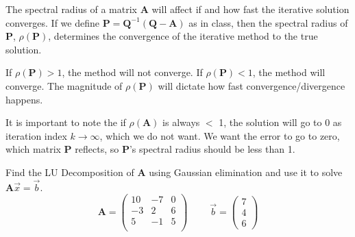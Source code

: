 \documentclass[12pts, answers]{exam}
\newcommand{\ve}[1]{\ensuremath{\mathbf{#1}}}
\begin{document}
\begin{questions}
\begin{solution}
The spectral radius of a matrix $\ve{A}$ will affect if and how fast the iterative solution converges. If we define $\ve{P} = \ve{Q}^{-1}(\ve{Q}-\ve{A})$ as in class, then the spectral radius of \ve{P}, $\rho(\ve{P})$, determines the convergence of the iterative method to the true solution. 

If $\rho(\ve{P}) > 1$, the method will not converge. If $\rho(\ve{P}) < 1$, the method will converge. The magnitude of $\rho(\ve{P})$ will dictate how fast convergence/divergence happens. 

It is important to note the if $\rho(\ve{A})$ is always $<$ 1, the solution will go to 0 as iteration index $k \rightarrow \infty$, which we do not want. We want the error to go to zero, which matrix \ve{P} reflects, so \ve{P}'s spectral radius should be less than 1.

\end{solution}


\vspace*{3em}
\addpoints
\question[10] Find the LU Decomposition of $\ve{A}$ using Gaussian elimination and use it to solve $\ve{A}\vec{x} = \vec{b}$.
%
\renewcommand{\baa}{10}
\renewcommand{\bab}{-7}
\renewcommand{\bac}{0}
\renewcommand{\bba}{-3}
\renewcommand{\bbb}{2}
\renewcommand{\bbc}{6}
\renewcommand{\bca}{5}
\renewcommand{\bcb}{-1}
\renewcommand{\bcc}{5}
\newcommand{\ba}{7}
\newcommand{\bb}{4}
\newcommand{\bc}{6}
%
\begin{equation}
\ve{A} = \begin{pmatrix}
   \baa & \bab & \bac \\
   \bba & \bbb & \bbc \\
   \bca & \bcb & \bcc \\
\end{pmatrix} \; \qquad
%
\vec{b} = \begin{pmatrix} \ba \\ \bb \\ \bc \end{pmatrix} \nonumber
\end{equation}


\end{questions}
\end{document}
